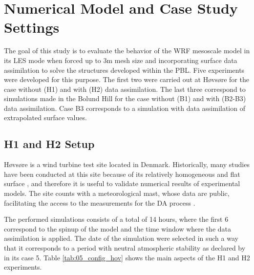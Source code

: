 \section{Numerical Model and Case Study Settings}
The goal of this study is to evaluate the behavior of the WRF mesoscale model in its LES mode when forced up to 3m mesh size and incorporating surface data assimilation to solve the structures developed within the PBL. Five experiments were developed for this purpose. The first two were carried out at Høvsøre for the case without (H1) and with (H2) data assimilation. The last three correspond to simulations made in the Bolund Hill for the case without (B1) and with (B2-B3) data assimilation. Case B3 corresponds to a simulation with data assimilation of extrapolated surface values.


\subsection{H1 and H2 Setup}
Høvsøre is a wind turbine test site located in Denmark. Historically, many studies have been conducted at this site because of its relatively homogeneous and flat surface \citep{Pea2015, Pea2013}, and therefore it is useful to validate numerical results of experimental models. The site counts with a meteorological mast, whose data are public, facilitating the access to the measurements for the DA process \citep{floors2013wind}.

The performed simulations consists of a total of 14 hours, where the first 6 correspond to the spinup of the model and the time window where the data assimilation is applied. The date of the simulation were selected in such a way that it corresponds to a period with neutral atmospheric stability as declared by \cite{Pea2013} in its case 5. Table \ref{tab:05_config_hov} shows the main aspects of the H1 and H2 experiments.

